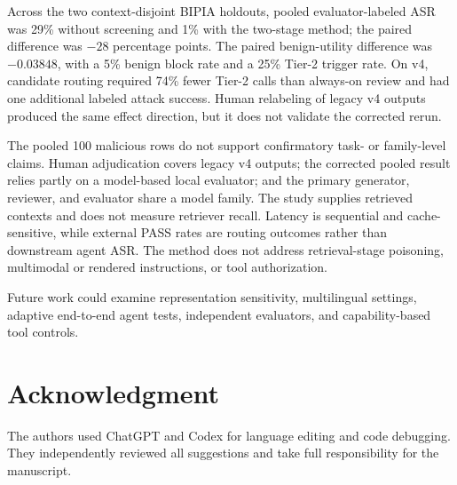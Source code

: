 \documentclass[conference,a4paper]{IEEEtran}
\begin{document}
Across the two context-disjoint BIPIA holdouts, pooled evaluator-labeled ASR was 29\% without screening and 1\% with the two-stage method; the paired difference was $-28$ percentage points. The paired benign-utility difference was $-0.03848$, with a 5\% benign block rate and a 25\% Tier-2 trigger rate. On v4, candidate routing required 74\% fewer Tier-2 calls than always-on review and had one additional labeled attack success. Human relabeling of legacy v4 outputs produced the same effect direction, but it does not validate the corrected rerun.

The pooled 100 malicious rows do not support confirmatory task- or family-level claims. Human adjudication covers legacy v4 outputs; the corrected pooled result relies partly on a model-based local evaluator; and the primary generator, reviewer, and evaluator share a model family. The study supplies retrieved contexts and does not measure retriever recall. Latency is sequential and cache-sensitive, while external PASS rates are routing outcomes rather than downstream agent ASR. The method does not address retrieval-stage poisoning, multimodal or rendered instructions, or tool authorization.

Future work could examine representation sensitivity, multilingual settings, adaptive end-to-end agent tests, independent evaluators, and capability-based tool controls.

\section*{Acknowledgment}
The authors used ChatGPT and Codex for language editing and code debugging. They independently reviewed all suggestions and take full responsibility for the manuscript.
\end{document}
